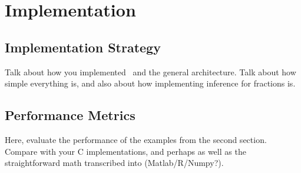 \section{Implementation}

\subsection{Implementation Strategy}

Talk about how you implemented \lang\ and the general
architecture. Talk about how simple everything is, and also
about how implementing inference for fractions is. 

\subsection{Performance Metrics}

Here, evaluate the performance of the examples from the second
section.  Compare with your C implementations, and perhaps as well as
the straightforward math transcribed into (Matlab/R/Numpy?).
